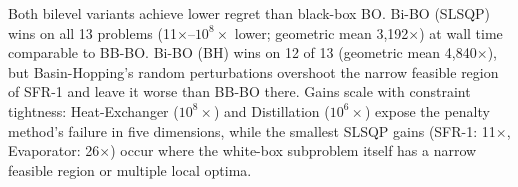 \documentclass[12pt,a4paper]{article}%
\theoremstyle{plain}%
\theoremstyle{remark}%
\theoremstyle{definition}%
\def\WB{\mathrm{WB}}
\def\BB{\mathrm{BB}}
\begin{document}


Both bilevel variants achieve lower regret than black-box BO. Bi-BO (SLSQP) wins on all 13 problems (11$\times$--$10^{8}\times$ lower; geometric mean 3{,}192$\times$) at wall time comparable to BB-BO. Bi-BO (BH) wins on 12 of 13 (geometric mean 4{,}840$\times$), but Basin-Hopping's random perturbations overshoot the narrow feasible region of SFR-1 and leave it worse than BB-BO there. Gains scale with constraint tightness: Heat-Exchanger ($10^{8}\times$) and Distillation ($10^{6}\times$) expose the penalty method's failure in five dimensions, while the smallest SLSQP gains (SFR-1: 11$\times$, Evaporator: 26$\times$) occur where the white-box subproblem itself has a narrow feasible region or multiple local optima.
\end{document}
